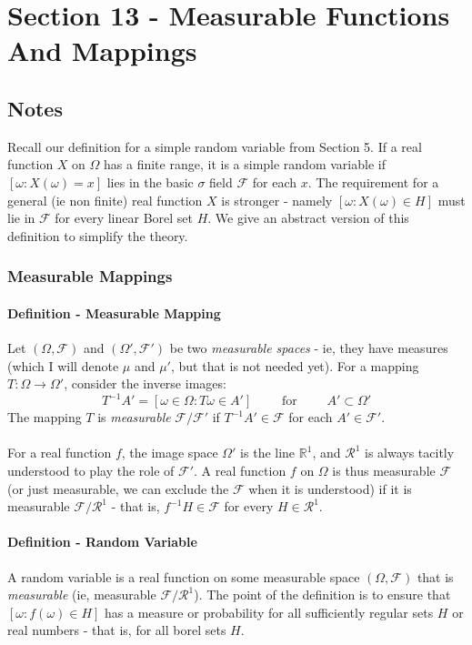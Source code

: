 \documentclass[12pt,a4paper]{article}
\newcommand{\1}[1]{\mathbbm{1}\left\{ #1 \right\}}
\newcommand{\R}{\mathbb{R}}
\newcommand{\fcal}{\mathcal{F}}
\newcommand{\rcal}{\mathcal{R}}
\begin{document}
\section{Section 13 - Measurable Functions And Mappings}
\subsection{Notes}
Recall our definition for a simple random variable from Section 5. If a real function $X$ on $\Omega$ has a finite range, it is a simple random variable if $[\omega : X(\omega) = x]$ lies in the basic $\sigma$ field $\fcal$ for each $x$. The requirement for a general (ie non finite) real function $X$ is stronger - namely $[\omega : X(\omega) \in H]$ must lie in $\fcal$ for every linear Borel set $H$. We give an abstract version of this definition to simplify the theory.

\subsubsection{Measurable Mappings}
\paragraph{Definition - Measurable Mapping} Let $(\Omega,\fcal)$ and $(\Omega',\fcal')$ be two \textit{measurable spaces} - ie, they have measures (which I will denote $\mu$ and $\mu'$, but that is not needed yet). For a mapping $T: \Omega \to \Omega'$, consider the inverse images:
$$
	T^{-1}A' = \left[\omega \in \Omega : T\omega \in A'\right] \quad\quad\text{ for }\quad\quad A' \subset \Omega'
$$
The mapping $T$ is \textit{measurable} $\fcal/\fcal'$ if $T^{-1}A' \in \fcal$ for each $A' \in \fcal'$.
\\\\
For a real function $f$, the image space $\Omega'$ is the line $\R^1$, and $\rcal^1$ is always tacitly understood to play the role of $\fcal'$. A real function $f$ on $\Omega$ is thus measurable $\fcal$ (or just measurable, we can exclude the $\fcal$ when it is understood) if it is measurable $\fcal/\rcal^1$ - that is, $f^{-1}H \in \fcal$ for every $H \in \rcal^1$.

\paragraph{Definition - Random Variable} A random variable is a real function on some measurable space $(\Omega,\fcal)$ that is \textit{measurable} (ie, measurable $\fcal/\rcal^1$). The point of the definition is to ensure that $[\omega : f(\omega) \in H]$ has a measure or probability for all sufficiently regular sets $H$ or real numbers - that is, for all borel sets $H$.
\end{document}
